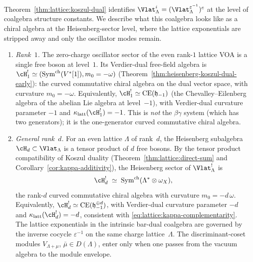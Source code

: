 \begin{remark}
\label{rem:lattice:dual-structure}%
%
\ClaimStatusConditional
Theorem~\ref{thm:lattice:koszul-dual} identifies
$\Vlat_\Lambda^i = (\Vlat_\Lambda^{\varepsilon^{-1}})^c$
at the level of coalgebra structure constants.
We describe what this coalgebra looks like as a chiral algebra
at the Heisenberg-sector level, where the lattice exponentials
are stripped away and only the oscillator modes remain.

\begin{enumerate}[label=\textup{(\roman*)}]
\item \emph{Rank~$1$.}
 The zero-charge oscillator sector of the even rank-$1$ lattice VOA is
 a single free boson at level~$1$. Its Verdier-dual free-field algebra is
 $\cH_1^!\simeq(\mathrm{Sym}^{\mathrm{ch}}(V^*[1]),m_0=-\omega)$
 (Theorem~\ref{thm:heisenberg-koszul-dual-early}):
 the curved commutative chiral algebra on the dual
 vector space, with curvature $m_0 = -\omega$.
 Equivalently, $\cH_1^! \simeq \mathrm{CE}(\mathfrak{h}_{-1})$
 (the Chevalley--Eilenberg algebra of the abelian Lie algebra
 at level~$-1$), with Verdier-dual curvature parameter
$-1$ and
 $\kappa_{\mathrm{latt}}(\cH_1^!) = -1$.
 This is \emph{not} the $\beta\gamma$ system
 (which has two generators); it is the one-generator
 curved commutative chiral algebra.

\item \emph{General rank~$d$.}
 For an even lattice $\Lambda$ of rank~$d$, the Heisenberg
 subalgebra $\cH_d \subset \Vlat_\Lambda$ is a tensor product
 of $d$ free bosons. By the tensor product compatibility
 of Koszul duality
 (Theorem~\ref{thm:lattice:direct-sum}
 and Corollary~\ref{cor:kappa-additivity}),
 the Heisenberg sector of $\Vlat_\Lambda^!$ is
 \begin{equation}\label{eq:lattice:dual-heisenberg-sector}
 \cH_d^!
 \;\simeq\;
 \mathrm{Sym}^{\mathrm{ch}}(\Lambda^* \otimes \omega_X),
 \end{equation}
 the rank-$d$ curved commutative chiral algebra
 with curvature $m_0 = -d\,\omega$.
 Equivalently, $\cH_d^! \simeq \mathrm{CE}(\mathfrak{h}_{-1}^{\oplus d})$,
 with Verdier-dual curvature parameter $-d$ and
 $\kappa_{\mathrm{latt}}(\cH_d^!) = -d$, consistent
 with \eqref{eq:lattice:kappa-complementarity}.
 The lattice exponentials in the intrinsic bar-dual coalgebra are
 governed by the inverse cocycle $\varepsilon^{-1}$ on the same
 charge lattice~$\Lambda$. The discriminant-coset modules
 $V_{\Lambda+\mu}$, $\bar\mu\in D(\Lambda)$, enter only when one
 passes from the vacuum algebra to the module envelope.


\end{enumerate}
\end{remark}
